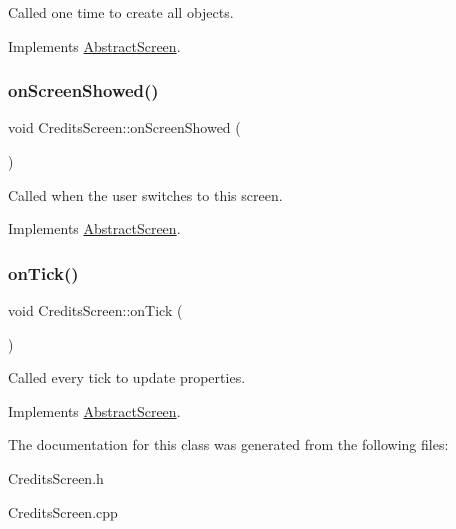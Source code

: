 Called one time to create all objects. 



Implements \mbox{\hyperlink{class_abstract_screen_a7ab389bd33f4824d3d353b5a9e1616de}{Abstract\+Screen}}.

\mbox{\label{class_credits_screen_a3fd4bc101df8b7560ab590c07997d472}} 
\subsubsection{\texorpdfstring{on\+Screen\+Showed()}{onScreenShowed()}}
{\footnotesize\ttfamily void Credits\+Screen\+::on\+Screen\+Showed (\begin{DoxyParamCaption}{ }\end{DoxyParamCaption})\hspace{0.3cm}{\ttfamily [virtual]}}



Called when the user switches to this screen. 



Implements \mbox{\hyperlink{class_abstract_screen_a219687a34e6aed15a9eaf0d4414d1783}{Abstract\+Screen}}.

\mbox{\label{class_credits_screen_aa6eab21c9a72bda052da4a68e384df62}} 
\subsubsection{\texorpdfstring{on\+Tick()}{onTick()}}
{\footnotesize\ttfamily void Credits\+Screen\+::on\+Tick (\begin{DoxyParamCaption}{ }\end{DoxyParamCaption})\hspace{0.3cm}{\ttfamily [virtual]}}



Called every tick to update properties. 



Implements \mbox{\hyperlink{class_abstract_screen_a3861213630fd23d4a3ff392191614ec2}{Abstract\+Screen}}.



The documentation for this class was generated from the following files\+:\begin{DoxyCompactItemize}
\item 
Credits\+Screen.\+h\item 
Credits\+Screen.\+cpp\end{DoxyCompactItemize}

